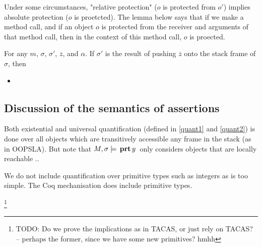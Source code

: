Under some circumstances, "relative protection" ($o$ is protected from $o'$) implies absolute protection ($o$ is proetcted).
The lemma below says that if we make a method call, and if an object $o$ is protected from  the receiver and arguments of that method call, then in the context of this method call, $o$ is proected.
 
 
 
 \begin{lemma}
 \label{lemma:rel:abs:prot}
 For any $m$, $\sigma$, $\sigma'$, $\overline z$, and $\alpha$. If $\sigma'$ is the result of pushing $\overline z$ onto the stack frame of $\sigma$,  %
 then
 \begin{itemize}
 \item
{}
 \end{itemize}
\end{lemma}
 
 \subsection{Discussion of the semantics of assertions}
 
 {Both existential and universal quantification (defined in \ref{quant1} and \ref{quant2}) is done over all objects which are transitively 
accessible any frame in the stack (as in OOPSLA). But note that $M , \sigma \models {\ensuremath{\, \mathbf{prt}}\, y\, }$ only considers objects that are locally reachable ..

We do not include quantification over primitive types such as integers as \LangOO is too simple. The 
Coq mechanisation does include primitive types.}
\footnote{TODO: Do we prove the implications as in TACAS, or just rely on TACAS? -- perhaps the former, since we have some new primitives? hmhh}

